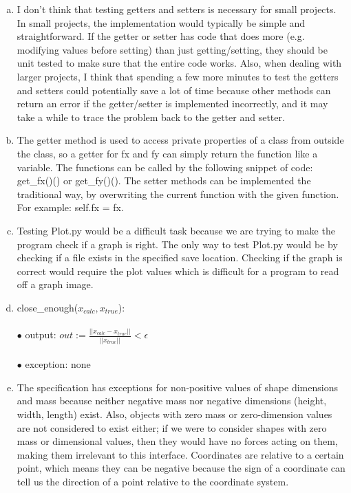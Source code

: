 \documentclass[12pt]{article}
\begin{document}
\begin{enumerate}[a)]

\item 
	I don’t think that testing getters and setters is necessary for small projects. In small projects, the implementation would typically be simple and straightforward. If the getter or setter has code that does more (e.g. modifying values before setting) than just getting/setting, they should be unit tested to make sure that the entire code works. Also, when dealing with larger projects, I think that spending a few more minutes to test the getters and setters could potentially save a lot of time because other methods can return an error if the getter/setter is implemented incorrectly, and it may take a while to trace the problem back to the getter and setter.

\item
	The getter method is used to access private properties of a class from outside the class, so a getter for fx and fy can simply return the function like a variable. The functions can be called by the following snippet of code: get\_fx()() or get\_fy()(). The setter methods can be implemented the traditional way, by overwriting the current function with the given function. For example: self.fx = fx.

\item
	Testing Plot.py would be a difficult task because we are trying to make the program check if a graph is right. The only way to test Plot.py would be by checking if a file exists in the specified save location. Checking if the graph is correct would require the plot values which is difficult for a program to read off a graph image.

\item
	close\_enough($x_{calc}, x_{true}$): \\ \\
	\hspace*{0.5cm} $\bullet$ output: $out := \frac{|| x_{calc} - x_{true} ||} {|| x_{true} ||} < \epsilon $ \\ \\
	\hspace*{0.5cm} $\bullet$ exception: none


	
\item
	The specification has exceptions for non-positive values of shape dimensions and mass because neither negative mass nor negative dimensions (height, width, length) exist. Also, objects with zero mass or zero-dimension values are not considered to exist either; if we were to consider shapes with zero mass or dimensional values, then they would have no forces acting on them, making them irrelevant to this interface. Coordinates are relative to a certain point, which means they can be negative because the sign of a coordinate can tell us the direction of a point relative to the coordinate system. 


\end{enumerate}
\end{document}
